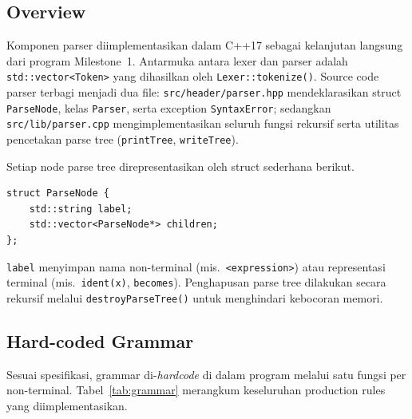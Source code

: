 \documentclass[11pt,a4paper]{article}
\begin{document}
\subsection{Overview}

Komponen parser diimplementasikan dalam C++17 sebagai kelanjutan langsung dari
program Milestone~1. Antarmuka antara lexer dan parser adalah \texttt{std::vector<Token>}
yang dihasilkan oleh \texttt{Lexer::tokenize()}. Source code parser terbagi
menjadi dua file: \texttt{src/header/parser.hpp} mendeklarasikan struct
\texttt{ParseNode}, kelas \texttt{Parser}, serta exception \texttt{SyntaxError};
sedangkan \texttt{src/lib/parser.cpp} mengimplementasikan seluruh fungsi rekursif
serta utilitas pencetakan parse tree (\texttt{printTree}, \texttt{writeTree}).

Setiap node parse tree direpresentasikan oleh struct sederhana berikut.

\begin{lstlisting}
struct ParseNode {
    std::string label;
    std::vector<ParseNode*> children;
};
\end{lstlisting}

\noindent
\texttt{label} menyimpan nama non-terminal (mis.\ \texttt{<expression>}) atau
representasi terminal (mis.\ \texttt{ident(x)}, \texttt{becomes}). Penghapusan
parse tree dilakukan secara rekursif melalui \texttt{destroyParseTree()} untuk
menghindari kebocoran memori.

\subsection{Hard-coded Grammar}

Sesuai spesifikasi, grammar di-\textit{hardcode} di dalam program melalui satu
fungsi per non-terminal. Tabel~\ref{tab:grammar} merangkum keseluruhan production
rules yang diimplementasikan.
\end{document}
